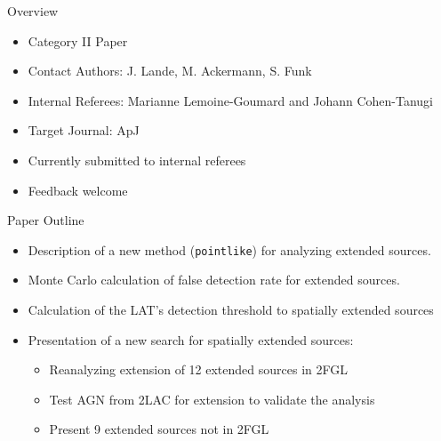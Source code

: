 \fermititle

\begin{frame}{Overview}
  \begin{itemize}
    \item Category II Paper
    \item Contact Authors: J. Lande, M. Ackermann, S. Funk
    \item Internal Referees: Marianne Lemoine-Goumard and Johann Cohen-Tanugi
    \item Target Journal: ApJ
    \item Currently submitted to internal referees
    \item Feedback welcome
  \end{itemize}
\end{frame}

\begin{frame}{Paper Outline}
  \begin{itemize}
    \item Description of a new method (\texttt{pointlike}) for analyzing extended sources.
    \item Monte Carlo calculation of false detection rate for extended sources.
    \item Calculation of the LAT's detection threshold 
      to spatially extended sources
    \item Presentation of a new search for spatially extended sources:
      \begin{itemize}
        \item Reanalyzing extension of 12 extended sources in 2FGL
        \item Test AGN from 2LAC for extension to validate the analysis
        \item Present 9 extended sources not in 2FGL
      \end{itemize}
  \end{itemize}
\end{frame}

